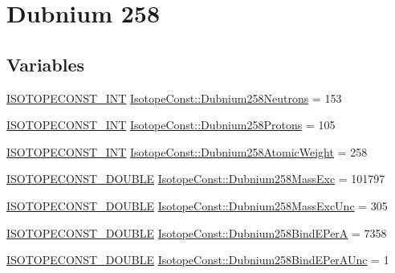 \hypertarget{group___isotope_const-_dubnium-_db258}{}\section{Dubnium 258}
\label{group___isotope_const-_dubnium-_db258}
\subsection*{Variables}
\begin{DoxyCompactItemize}
\item 
\mbox{\hyperlink{group___isotope_const-_macros_ga5f18360b3e99483a35c32d789e62621c}{I\+S\+O\+T\+O\+P\+E\+C\+O\+N\+S\+T\+\_\+\+I\+NT}} \mbox{\hyperlink{group___isotope_const-_dubnium-_db258_ga0e6fe3f4e1e35cb831184ce910fb70ed}{Isotope\+Const\+::\+Dubnium258\+Neutrons}} = 153
\item 
\mbox{\hyperlink{group___isotope_const-_macros_ga5f18360b3e99483a35c32d789e62621c}{I\+S\+O\+T\+O\+P\+E\+C\+O\+N\+S\+T\+\_\+\+I\+NT}} \mbox{\hyperlink{group___isotope_const-_dubnium-_db258_ga01c90744558f27f2651ca7bba8cad737}{Isotope\+Const\+::\+Dubnium258\+Protons}} = 105
\item 
\mbox{\hyperlink{group___isotope_const-_macros_ga5f18360b3e99483a35c32d789e62621c}{I\+S\+O\+T\+O\+P\+E\+C\+O\+N\+S\+T\+\_\+\+I\+NT}} \mbox{\hyperlink{group___isotope_const-_dubnium-_db258_ga02775c945fbd605370d557d8a312cff5}{Isotope\+Const\+::\+Dubnium258\+Atomic\+Weight}} = 258
\item 
\mbox{\hyperlink{group___isotope_const-_macros_ga8f45a7272ce02c0b4c65c44636ed719a}{I\+S\+O\+T\+O\+P\+E\+C\+O\+N\+S\+T\+\_\+\+D\+O\+U\+B\+LE}} \mbox{\hyperlink{group___isotope_const-_dubnium-_db258_ga6b77b25b2a214a3b6458e8feebdb8cda}{Isotope\+Const\+::\+Dubnium258\+Mass\+Exc}} = 101797
\item 
\mbox{\hyperlink{group___isotope_const-_macros_ga8f45a7272ce02c0b4c65c44636ed719a}{I\+S\+O\+T\+O\+P\+E\+C\+O\+N\+S\+T\+\_\+\+D\+O\+U\+B\+LE}} \mbox{\hyperlink{group___isotope_const-_dubnium-_db258_ga3326b51a7b33c1ba546588d3d4eb8d47}{Isotope\+Const\+::\+Dubnium258\+Mass\+Exc\+Unc}} = 305
\item 
\mbox{\hyperlink{group___isotope_const-_macros_ga8f45a7272ce02c0b4c65c44636ed719a}{I\+S\+O\+T\+O\+P\+E\+C\+O\+N\+S\+T\+\_\+\+D\+O\+U\+B\+LE}} \mbox{\hyperlink{group___isotope_const-_dubnium-_db258_ga131fdf96368f0be33446ff1853848500}{Isotope\+Const\+::\+Dubnium258\+Bind\+E\+PerA}} = 7358
\item 
\mbox{\hyperlink{group___isotope_const-_macros_ga8f45a7272ce02c0b4c65c44636ed719a}{I\+S\+O\+T\+O\+P\+E\+C\+O\+N\+S\+T\+\_\+\+D\+O\+U\+B\+LE}} \mbox{\hyperlink{group___isotope_const-_dubnium-_db258_ga126e82996e2627ccda311c46ea31aa80}{Isotope\+Const\+::\+Dubnium258\+Bind\+E\+Per\+A\+Unc}} = 1

\end{DoxyCompactItemize}
